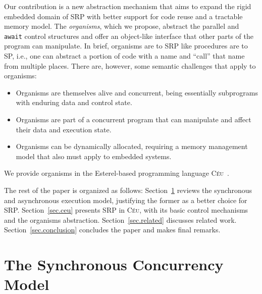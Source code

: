 \documentclass{acm_proc_article-sp}
\newcommand{\CEU}{\textsc{C\'{e}u}\xspace}
\newcommand{\code}[1] {{\small{\texttt{#1}}}}
\newcommand{\1}{\;}
\newcommand{\2}{\;\;}
\newcommand{\3}{\;\;\;}
\newcommand{\5}{\;\;\;\;\;}
\begin{document}
Our contribution is a new abstraction mechanism that aims to expand the rigid 
embedded domain of SRP with better support for code reuse and a tractable 
memory model.
%
The \emph{organisms}, which we propose, abstract the parallel and \code{await} 
control structures and offer an object-like interface that other parts of the 
program can manipulate.
%
In brief, organisms are to SRP like procedures are to SP, i.e., one can 
abstract a portion of code with a name and ``call'' that name from multiple 
places.
%
There are, however, some semantic challenges that apply to organisms:
%
\begin{itemize}
\item Organisms are themselves alive and concurrent, being essentially 
subprograms with enduring data and control state.
\item Organisms are part of a concurrent program that can manipulate and affect 
their data and execution state.
\item Organisms can be dynamically allocated, requiring a memory management 
model that also must apply to embedded systems.
\end{itemize}
%
We provide organisms in the Esterel-based programming language 
\CEU~\cite{ceu.sensys13}.
%

The rest of the paper is organized as follows:
Section~\ref{sec.synchronous} reviews the synchronous and asynchronous 
execution model, justifying the former as a better choice for SRP.
Section~\ref{sec.ceu} presents SRP in \CEU, with its basic control mechanisms 
and the organisms abstraction.
Section~\ref{sec.related} discusses related work.
Section~\ref{sec.conclusion} concludes the paper and makes final remarks.

\section{The Synchronous Concurrency Model}
\label{sec.synchronous}
\end{document}
